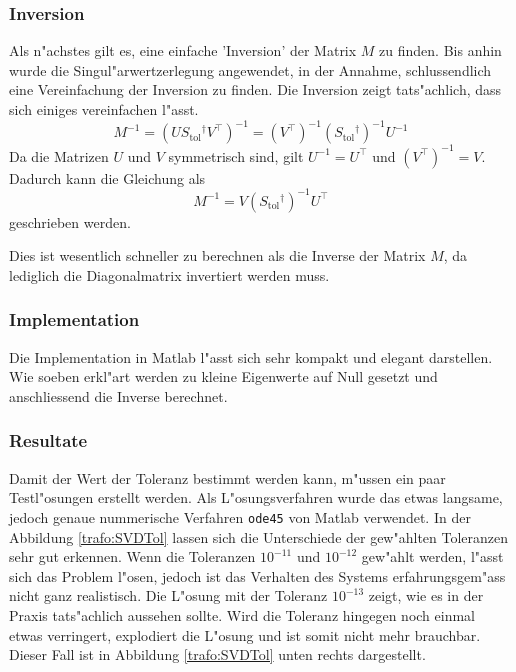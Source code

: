 \begin{refsection}
\subsubsection{Inversion}
Als n"achstes gilt es, eine einfache 'Inversion' der Matrix $M$ zu finden. Bis anhin wurde die Singul"arwertzerlegung angewendet, in der Annahme, schlussendlich eine Vereinfachung der Inversion zu finden. Die Inversion zeigt tats"achlich, dass sich einiges vereinfachen l"asst. \cite{trafo:Watkins}
\begin{equation*}
	M^{-1} = \left(U S{_\text{tol}}^\dagger V^\top\right)^{-1} = \left(V^\top\right)^{-1} \left(S{_\text{tol}}^\dagger\right)^{-1} U^{-1}
\end{equation*}
Da die Matrizen $U$ und $V$ symmetrisch sind, gilt $U^{-1} = U^\top$ und $\left(V^\top\right)^{-1} = V$. Dadurch kann die Gleichung als 
\begin{equation*}
	M^{-1} = V \left(S{_\text{tol}}^\dagger \right)^{-1} U^\top
\end{equation*}
geschrieben werden.

Dies ist wesentlich schneller zu berechnen als die Inverse der Matrix $M$, da lediglich die Diagonalmatrix invertiert werden muss.

\subsubsection{Implementation \label{trafo:SVD}}
Die Implementation in Matlab l"asst sich sehr kompakt und elegant darstellen. Wie soeben erkl"art werden zu kleine Eigenwerte auf Null gesetzt und anschliessend die Inverse berechnet. 

{\scriptsize }

\subsubsection{Resultate}
Damit der Wert der Toleranz bestimmt werden kann, m"ussen ein paar Testl"osungen erstellt werden. Als L"osungsverfahren wurde das etwas langsame, jedoch genaue nummerische Verfahren \texttt{ode45} von Matlab verwendet. In der Abbildung \ref{trafo:SVDTol} lassen sich die Unterschiede der gew"ahlten Toleranzen sehr gut erkennen. Wenn die Toleranzen $10^{-11}$ und $10^{-12}$ gew"ahlt werden, l"asst sich das Problem l"osen, jedoch ist das Verhalten des Systems erfahrungsgem"ass nicht ganz realistisch. Die L"osung mit der Toleranz $10^{-13}$ zeigt, wie es in der Praxis tats"achlich aussehen sollte. Wird die Toleranz hingegen noch einmal etwas verringert, explodiert die L"osung und ist somit nicht mehr brauchbar. Dieser Fall ist in Abbildung \ref{trafo:SVDTol} unten rechts dargestellt.


\end{refsection}

